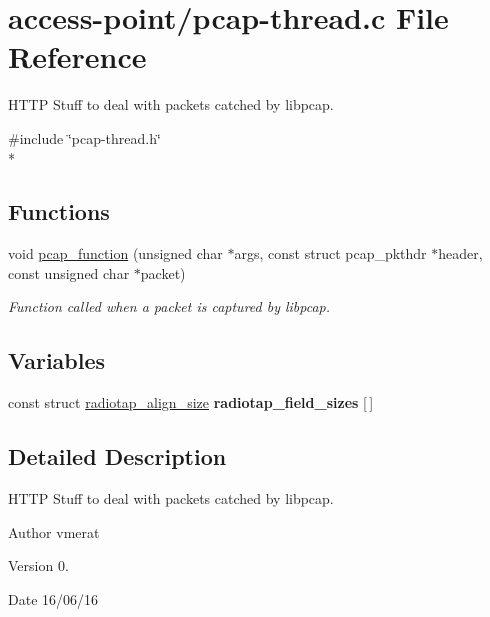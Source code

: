 \hypertarget{pcap-thread_8c}{\section{access-\/point/pcap-\/thread.c File Reference}
\label{pcap-thread_8c}
}


H\-T\-T\-P Stuff to deal with packets catched by libpcap.  


{\ttfamily \#include \char`\"{}pcap-\/thread.\-h\char`\"{}}\\*
\subsection*{Functions}
\begin{DoxyCompactItemize}
\item 
void \hyperlink{pcap-thread_8c_aa3e276e495ceedb3b1b14b175798790f}{pcap\-\_\-function} (unsigned char $\ast$args, const struct pcap\-\_\-pkthdr $\ast$header, const unsigned char $\ast$packet)
\begin{DoxyCompactList}\small\item\em Function called when a packet is captured by libpcap. \end{DoxyCompactList}\end{DoxyCompactItemize}
\subsection*{Variables}
\begin{DoxyCompactItemize}
\item 
const struct \hyperlink{structradiotap__align__size}{radiotap\-\_\-align\-\_\-size} {\bfseries radiotap\-\_\-field\-\_\-sizes} \mbox{[}$\,$\mbox{]}
\end{DoxyCompactItemize}


\subsection{Detailed Description}
H\-T\-T\-P Stuff to deal with packets catched by libpcap. \begin{DoxyAuthor}{Author}
vmerat 
\end{DoxyAuthor}
\begin{DoxyVersion}{Version}
0. 
\end{DoxyVersion}
\begin{DoxyDate}{Date}
16/06/16 
\end{DoxyDate}


